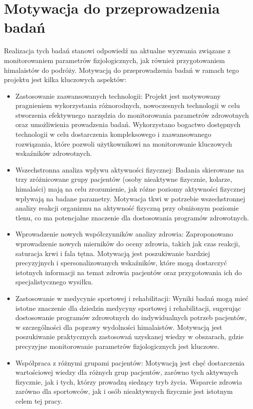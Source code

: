\section{Motywacja do przeprowadzenia badań}
Realizacja tych badań stanowi odpowiedź na aktualne wyzwania związane z monitorowaniem parametrów fizjologicznych, jak również przygotowaniem himalaistów do podróży. Motywacją do przeprowadzenia badań w ramach tego projektu jest kilka kluczowych aspektów:
\begin{itemize}
    \item Zastosowanie zaawansowanych technologii: Projekt jest motywowany pragnieniem wykorzystania różnorodnych, nowoczesnych technologii w celu stworzenia efektywnego narzędzia do monitorowania parametrów zdrowotnych oraz umożliwienia prowadzenia badań. Wykorzystano bogactwo dostępnych technologii w celu dostarczenia kompleksowego i zaawansowanego rozwiązania, które pozwoli użytkownikowi na monitorowanie kluczowych wskaźników zdrowotnych.
    \item Wszechstronna analiza wpływu aktywności fizycznej: Badania skierowane na trzy zróżnicowane grupy pacjentów (osoby nieaktywne fizycznie, kolarze, himalaści) mają na celu zrozumienie, jak różne poziomy aktywności fizycznej wpływają na badane parametry. Motywacja tkwi w potrzebie wszechstronnej analizy reakcji organizmu na aktywność fizyczną przy obniżonym poziomie tlenu, co ma potencjalne znaczenie dla dostosowania programów zdrowotnych.
    \item Wprowadzenie nowych współczynników analizy zdrowia: Zaproponowano wprowadzenie nowych mierników do oceny zdrowia, takich jak czas reakcji, saturacja krwi i fala tętna. Motywacją jest poszukiwanie bardziej precyzyjnych i spersonalizowanych wskaźników, które mogą dostarczyć istotnych informacji na temat zdrowia pacjentów oraz przygotowania ich do specjalistycznego wysiłku.
    \item Zastosowanie w medycynie sportowej i rehabilitacji: Wyniki badań mogą mieć istotne znaczenie dla dziedzin medycyny sportowej i rehabilitacji, sugerując dostosowanie programów zdrowotnych do indywidualnych potrzeb pacjentów, w szczególności dla poprawy wydolności himalaistów. Motywacją jest poszukiwanie praktycznych zastosowań uzyskanej wiedzy w obszarach, gdzie precyzyjne monitorowanie parametrów fizjologicznych jest kluczowe.
    \item Współpraca z różnymi grupami pacjentów: Motywacją jest chęć dostarczenia wartościowej wiedzy dla różnych grup pacjentów, zarówno tych aktywnych fizycznie, jak i tych, którzy prowadzą siedzący tryb życia. Wsparcie zdrowia zarówno dla sportowców, jak i osób nieaktywnych fizycznie jest istotnym celem tej pracy.
\end{itemize}

